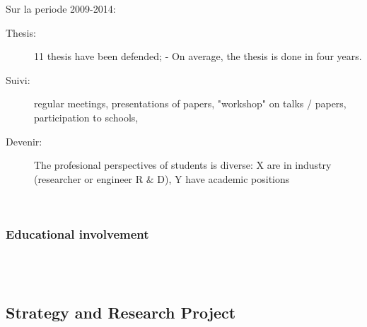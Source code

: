 Sur la periode 2009-2014: 
\begin{description}

\item[Thesis:]  11 thesis have been defended;  - On average, the thesis is done in four years. 


\item[Suivi:] regular meetings, presentations of papers, "workshop" on talks / papers, participation to schools,

\item[Devenir:]  
The profesional perspectives of  students is diverse: X are in industry (researcher or engineer R  $\&$ D),  Y have academic positions

\ \\


\end{description}

\subsubsection*{Educational involvement} %

\ \\


\ \\


\subsection{Strategy and Research Project} %
\label{sub:hadas_strategy_and_research_project}



\ \\


\ \\


